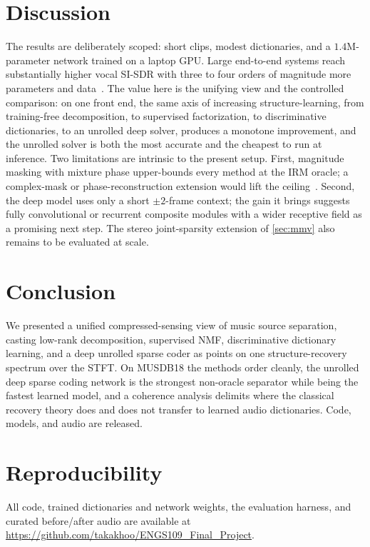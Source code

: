 \documentclass{article}
\begin{document}
\section{Discussion}
\label{sec:discuss}
The results are deliberately scoped: short clips, modest dictionaries, and a
$1.4$M-parameter network trained on a laptop GPU. Large end-to-end systems
reach substantially higher vocal SI-SDR with three to four orders of magnitude more
parameters and data~\cite{rouard2023htdemucs,mitsufuji2022mdx}. The value here is
the unifying view and the controlled comparison: on one front end, the same axis of
increasing structure-learning, from training-free decomposition, to supervised
factorization, to discriminative dictionaries, to an unrolled deep solver, produces
a monotone improvement, and the unrolled solver is both the most accurate and the
cheapest to run at inference. Two limitations are intrinsic to the present setup.
First, magnitude masking with mixture phase upper-bounds every method at the IRM
oracle; a complex-mask or phase-reconstruction extension would lift the
ceiling~\cite{luo2019convtasnet}. Second, the deep model uses only a short
$\pm2$-frame context; the gain it brings suggests fully convolutional or recurrent
composite modules with a wider receptive field as a promising next step. The stereo
joint-sparsity extension of \cref{sec:mmv} also remains to be evaluated at scale.

\section{Conclusion}
We presented a unified compressed-sensing view of music source separation, casting
low-rank decomposition, supervised NMF, discriminative dictionary learning, and a
deep unrolled sparse coder as points on one structure-recovery spectrum over the
STFT. On MUSDB18 the methods order cleanly, the unrolled deep sparse coding network
is the strongest non-oracle separator while being the fastest learned model, and a
coherence analysis delimits where the classical recovery theory does and does not
transfer to learned audio dictionaries. Code, models, and audio are released.

\section*{Reproducibility}
All code, trained dictionaries and network weights, the evaluation harness, and
curated before/after audio are available at
\url{https://github.com/takakhoo/ENGS109_Final_Project}.



\end{document}
